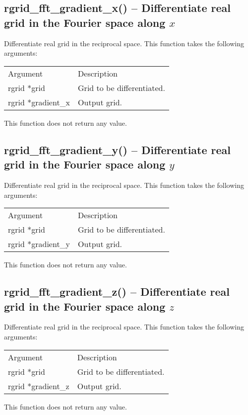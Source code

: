 \documentclass[12pt,letterpaper]{report}
\begin{document}
\subsection{rgrid\_fft\_gradient\_x() -- Differentiate real grid in the Fourier space along $x$}

Differentiate real grid in the reciprocal space. This function takes the following arguments:
\begin{longtable}{p{} p{}}
Argument & Description\\
\cline{1-2}
rgrid *grid & Grid to be differentiated.\\
rgrid *gradient\_x & Output grid.\\
\end{longtable}
\noindent
This function does not return any value.

\subsection{rgrid\_fft\_gradient\_y() -- Differentiate real grid in the Fourier space along $y$}

Differentiate real grid in the reciprocal space. This function takes the following arguments:
\begin{longtable}{p{} p{}}
Argument & Description\\
\cline{1-2}
rgrid *grid & Grid to be differentiated.\\
rgrid *gradient\_y & Output grid.\\
\end{longtable}
\noindent
This function does not return any value.

\subsection{rgrid\_fft\_gradient\_z() -- Differentiate real grid in the Fourier space along $z$}

Differentiate real grid in the reciprocal space. This function takes the following arguments:
\begin{longtable}{p{} p{}}
Argument & Description\\
\cline{1-2}
rgrid *grid & Grid to be differentiated.\\
rgrid *gradient\_z & Output grid.\\
\end{longtable}
\noindent
This function does not return any value.
\end{document}
